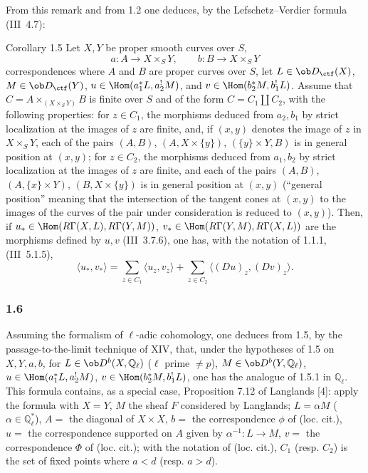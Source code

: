 From this remark and from 1.2 one deduces, by the Lefschetz--Verdier formula (III~4.7):

\begin{statement}{Corollary 1.5}
Let $X,Y$ be proper smooth curves over $S$,
\[
a:A\longrightarrow X\times_S Y,
\qquad
b:B\longrightarrow X\times_S Y
\]
correspondences where $A$ and $B$ are proper curves over $S$, let $L\in\ob D_{\ctf}(X)$, $M\in\ob D_{\ctf}(Y)$, $u\in\Hom(a_1^*L,a_2^!M)$, and $v\in\Hom(b_2^*M,b_1^!L)$. Assume that $C=A\times_{(X\times_S Y)}B$ is finite over $S$ and of the form $C=C_1\amalg C_2$, with the following properties: for $z\in C_1$, the morphisms deduced from $a_2,b_1$ by strict localization at the images of $z$ are finite, and, if $(x,y)$ denotes the image of $z$ in $X\times_S Y$, each of the pairs $(A,B)$, $(A,X\times\{y\})$, $(\{y\}\times Y,B)$ is in general position at $(x,y)$; for $z\in C_2$, the morphisms deduced from $a_1,b_2$ by strict localization at the images of $z$ are finite, and each of the pairs $(A,B)$, $(A,\{x\}\times Y)$, $(B,X\times\{y\})$ is in general position at $(x,y)$ (``general position'' meaning that the intersection of the tangent cones at $(x,y)$ to the images of the curves of the pair under consideration is reduced to $(x,y)$). Then, if $u_*\in\Hom(R\Gamma(X,L),R\Gamma(Y,M))$, $v_*\in\Hom(R\Gamma(Y,M),R\Gamma(X,L))$ are the morphisms defined by $u,v$ (III~3.7.6), one has, with the notation of 1.1.1, (III~5.1.5),
\begin{equation}\tag{1.5.1}
\langle u_*,v_*\rangle=\sum_{z\in C_1}\langle u_z,v_z\rangle+\sum_{z\in C_2}\langle (Du)_z,(Dv)_z\rangle.
\end{equation}
\end{statement}

\subsubsection*{1.6}
Assuming the formalism of $\ell$-adic cohomology, one deduces from 1.5, by the passage-to-the-limit technique of XIV, that, under the hypotheses of 1.5 on $X,Y,a,b$, for $L\in\ob D^b(X,\mathbb Q_\ell)$ ($\ell$ prime $\ne p$), $M\in\ob D^b(Y,\mathbb Q_\ell)$, $u\in\Hom(a_1^*L,a_2^!M)$, $v\in\Hom(b_2^*M,b_1^!L)$, one has the analogue of 1.5.1 in $\mathbb Q_\ell$. This formula contains, as a special case, Proposition 7.12 of Langlands [4]: apply the formula with $X=Y$, $M$ the sheaf $F$ considered by Langlands; $L=\alpha M$ ($\alpha\in\mathbb Q_\ell^*$), $A=$ the diagonal of $X\times X$, $b=$ the correspondence $\phi$ of (loc. cit.), $u=$ the correspondence supported on $A$ given by $\alpha^{-1}:L\to M$, $v=$ the correspondence $\Phi$ of (loc. cit.); with the notation of (loc. cit.), $C_1$ (resp. $C_2$) is the set of fixed points where $a<d$ (resp. $a>d$).

